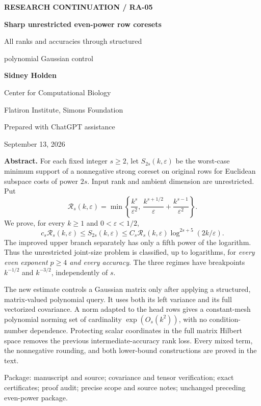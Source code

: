 \documentclass[11pt]{article}
\theoremstyle{remark}\newtheorem{remark}[theorem]{Remark}
\newcommand{\eps}{\varepsilon}\newcommand{\Sym}{\operatorname{Sym}}
\begin{document}
\begin{titlepage}
{\small\bfseries RESEARCH CONTINUATION / RA-05}\par\vspace{1.05cm}
{\huge\bfseries Sharp unrestricted even-power row coresets}\par\vspace{.45cm}
{\Large All ranks and accuracies through structured\par polynomial Gaussian control}\par\vspace{.7cm}
\textbf{Sidney Holden}\par Center for Computational Biology\par Flatiron Institute, Simons Foundation\par Prepared with ChatGPT assistance\par
September 13, 2026\par\vspace{.65cm}
\textbf{Abstract.} For each fixed integer $s\ge2$, let $S_{2s}(k,\eps)$ be the worst-case minimum support of a nonnegative strong coreset on original rows for Euclidean subspace costs of power $2s$. Input rank and ambient dimension are unrestricted. Put
\[
 \mathcal R_s(k,\eps)=\min\left\{\frac{k^s}{\eps^2},\ \frac{k^{s+1/2}}{\eps}+\frac{k^{s-1}}{\eps^2}\right\}.
\]
We prove, for every $k\ge1$ and $0<\eps<1/2$,
\[
 c_s\mathcal R_s(k,\eps)\le S_{2s}(k,\eps)
 \le C_s\mathcal R_s(k,\eps)\log^{2s+5}(2k/\eps).
\]
The improved upper branch separately has only a fifth power of the logarithm. Thus the unrestricted joint-size problem is classified, up to logarithms, for \emph{every even exponent $p\ge4$ and every accuracy}. The three regimes have breakpoints $k^{-1/2}$ and $k^{-3/2}$, independently of $s$.

The new estimate controls a Gaussian matrix only after applying a structured, matrix-valued polynomial query. It uses both its left variance and its full vectorized covariance. A norm adapted to the head rows gives a constant-mesh polynomial norming set of cardinality $\exp(O_s(k^2))$, with no condition-number dependence. Protecting scalar coordinates in the full matrix Hilbert space removes the previous intermediate-accuracy rank loss. Every mixed term, the nonnegative rounding, and both lower-bound constructions are proved in the text.

\vspace{.2cm}
\vfill
{\small Package: manuscript and source; covariance and tensor verification; exact certificates; proof audit; precise scope and source notes; unchanged preceding even-power package.}
\end{titlepage}
\end{document}

